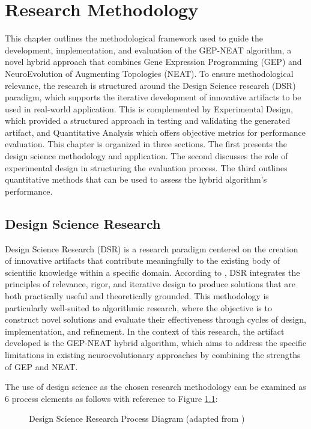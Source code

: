 \chapter{Research Methodology}
This chapter outlines the methodological framework used to guide the development, implementation, and evaluation of the GEP-NEAT algorithm, a novel hybrid approach that combines Gene Expression Programming (GEP) and NeuroEvolution of Augmenting Topologies (NEAT). To ensure methodological relevance, the research is structured around the Design Science research (DSR) paradigm, which supports the iterative development of innovative artifacts to be used in real-world application. This is complemented by Experimental Design, which provided a structured approach in testing and validating the generated artifact, and Quantitative Analysis which offers objective metrics for performance evaluation. This chapter is organized in three sections. The first presents the design science methodology and application. The second discusses the role of experimental design in structuring the evaluation process. The third outlines quantitative methods that can be used to assess the hybrid algorithm's performance.

\section{Design Science Research}
Design Science Research (DSR) is a research paradigm centered on the creation of innovative artifacts that contribute meaningfully to the existing body of scientific knowledge within a specific domain. According to \cite{hevner2004design}, DSR integrates the principles of relevance, rigor, and iterative design to produce solutions that are both practically useful and theoretically grounded. This methodology is particularly well-suited to algorithmic research, where the objective is to construct novel solutions and evaluate their effectiveness through cycles of design, implementation, and refinement. In the context of this research, the artifact developed is the GEP-NEAT hybrid algorithm, which aims to address the specific limitations in existing neuroevolutionary approaches by combining the strengths of GEP and NEAT. \bigskip

\noindent The use of design science as the chosen research methodology can be examined as 6 process elements as follows with reference to Figure \ref{fig:dsr}:


\begin{figure}[H] %
	\centering %
	\caption{Design Science Research Process Diagram (adapted from \cite{hevner2004design})}
	\label{fig:dsr} %
\end{figure}

